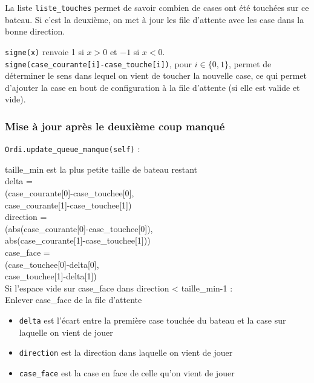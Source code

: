 La liste \texttt{liste\_touches} permet de savoir combien de cases ont été touchées sur ce bateau. Si c'est la deuxième, on met à jour les file d'attente avec les case dans la bonne direction.

\texttt{signe(x)} renvoie 1 si $x>0$ et $-1$ si $x<0$.\\
\texttt{signe(case\_courante[i]-case\_touche[i])}, pour $i\in\{0,1\}$, permet de déterminer le sens dans lequel on vient de toucher la nouvelle case, ce qui permet d'ajouter la case en bout de configuration à la file d'attente (si elle est valide et vide).

\newpage
\subsubsection{Mise à jour après le deuxième coup manqué}\label{update_queue_manque}
\texttt{Ordi.update\_queue\_manque(self)} :

\begin{algo1}
taille\_min est la plus petite taille de bateau restant\\
delta = \\
(case\_courante[0]-case\_touchee[0],\\
case\_courante[1]-case\_touchee[1])\\
direction = \\
(abs(case\_courante[0]-case\_touchee[0]),\\
abs(case\_courante[1]-case\_touchee[1]))\\
case\_face = \\
(case\_touchee[0]-delta[0],\\
case\_touchee[1]-delta[1])\\
Si l'espace vide sur case\_face dans direction < taille\_min-1 :\\
Enlever case\_face de la file d'attente\\
\end{algo1}

\begin{itemize}
\item \texttt{delta} est l'écart entre la première case touchée du bateau et la case sur laquelle on vient de jouer
\item \texttt{direction} est la direction dans laquelle on vient de jouer
\item \texttt{case\_face} est la case en face de celle qu'on vient de jouer
\end{itemize}

